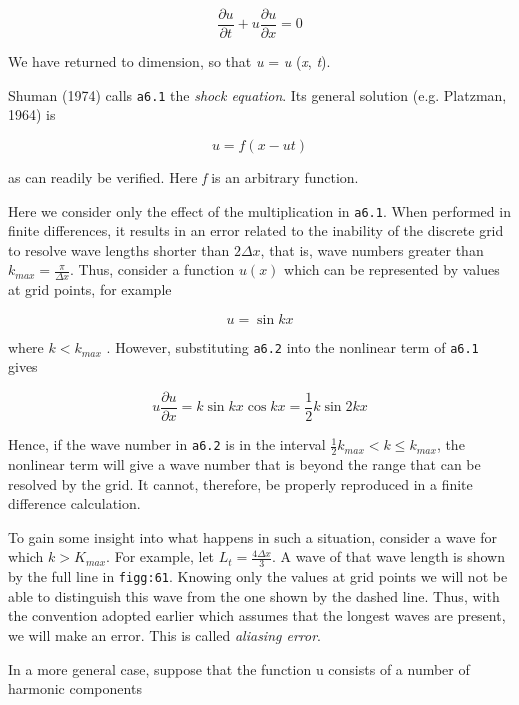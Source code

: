 {\[\frac{\partial u}{\partial t} + u\frac{\partial u}{\partial x} = 0\]}

We have returned to dimension, so that \emph{u} = \emph{u} (\emph{x},
\emph{t}).

Shuman (1974) calls \texttt{a6.1} the \emph{shock equation}. Its general
solution (e.g. Platzman, 1964) is

\[u = f\left( x - ut \right)\]

as can readily be verified. Here \emph{f} is an arbitrary function.

Here we consider only the effect of the multiplication in \texttt{a6.1}.
When performed in finite differences, it results in an error related to
the inability of the discrete grid to resolve wave lengths shorter than
\(2\Delta x\), that is, wave numbers greater than
\(k_{max} = \frac{\pi}{\Delta x}\). Thus, consider a function
\(u\left( x \right)\) which can be represented by values at grid points,
for example

{\[u = \sin{kx}\]}

where \({k < k}_{max}\) . However, substituting \texttt{a6.2} into the
nonlinear term of \texttt{a6.1} gives

\[u\frac{\partial u}{\partial x} = k\sin{kx}\cos{kx} = \frac{1}{2}k\sin{2kx}\]

Hence, if the wave number in \texttt{a6.2} is in the interval
\(\frac{1}{2}k_{max} < k \leq k_{max}\), the nonlinear term will give a
wave number that is beyond the range that can be resolved by the grid.
It cannot, therefore, be properly reproduced in a finite difference
calculation.

To gain some insight into what happens in such a situation, consider a
wave for which \(k > K_{max}\). For example, let
\(L_{t} = \frac{4\Delta x}{3}\). A wave of that wave length is shown by
the full line in \texttt{figg:61}. Knowing only the values at grid
points we will not be able to distinguish this wave from the one shown
by the dashed line. Thus, with the convention adopted earlier which
assumes that the longest waves are present, we will make an error. This
is called \emph{aliasing error}.

\begin{figure}
\centering
{}
\caption{}
\end{figure}

In a more general case, suppose that the function u consists of a number
of harmonic components

